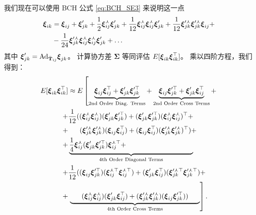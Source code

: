 我们现在可以使用 \ac{BCH} 公式 \eqref{eq:BCH_SE3} 来说明这一点 
\begin{align}
    \xib{ik} &= \xib{ij} + \xip{jk} + \frac{1}{2}\xic{ij}\xip{jk} + \frac{1}{12}\xic{ij}\xic{ij}\xip{jk} + \frac{1}{12}\xipc{jk}\xipc{jk}\xib{ij} + \nonumber\\
    &- \frac{1}{24}\xipc{jk}\xic{ij}\xic{ij}\xip{jk} + \dots \label{eq:BCH_compound_pose}
\end{align}
其中 $\boldsymbol{\xi}^\prime_{jk} = \mathrm{Ad}_{\bar{\mathbf{T}}_{ij}}\boldsymbol{\xi}_{jk}$。
计算协方差 $\boldsymbol{\Sigma}$ 等同评估 $E[\boldsymbol{\xi}_{ik}\boldsymbol{\xi}_{ik}^\top]$。 
乘以四阶方程，我们得到： 
\begin{align}
    E[\xib{ik}\xibt{ik}] &\approx E\left[ \underbrace{\xib{ij}\xibt{ij} + 
    \xip{jk}\xipt{jk}}_\text{2nd Order Diag. Terms} + \underbrace{\xib{ij}\xipt{jk} + \xip{jk}\xibt{ij}}_\text{2nd Order Cross Terms} +  \right. \label{eq:2nd_order}\\
    + &\frac{1}{12}( 
    (\xic{ij}\xic{ij})(\xip{jk}\xipt{jk}) + 
    (\xip{jk}\xipt{jk})(\xic{ij}\xic{ij})^\top + \nonumber \\
    + &~~~~~(\xipc{jk}\xipc{jk})(\xib{ij}\xibt{ij}) + 
    (\xib{ij}\xibt{ij})(\xipc{jk}\xipc{jk})^\top ) + \label{eq:4th_order_diag}\\
    + &\underbrace{\frac{1}{4}\xic{ij}(\xip{jk}\xipt{jk})\xict{ij} + ~~~~~~~~~~~~~~~~~~~~~~~~~~~~~}_\text{4th Order Diagonal Terms} \nonumber \\
    + &\frac{1}{12}( 
    (\xib{ij}\xipt{jk})(\xict{ij}\xict{ij}) + 
    (\xip{jk}\xibt{ij})(\xipct{jk}\xipct{jk}) + \label{eq:4th_order_cross} \\ %
    + &\left.\underbrace{~~~~~(\xic{ij}\xic{ij})(\xip{jk}\xibt{ij}) +
    (\xipc{jk}\xipc{jk})(\xib{ij}\xipt{jk}))~~~~~}_\text{4th Order Cross Terms} 
    \right]. \nonumber 
\end{align}

